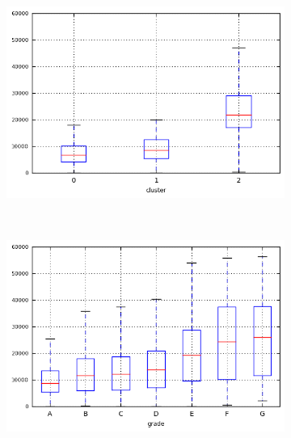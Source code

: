 \begin{anexosenv}
\begin{figure}[ht!]
\begin{subfigure}[t]{0.45\textwidth}
        \end{subfigure}
\end{figure}



\begin{figure}[ht!]
    \centering
        \caption{\emph{Boxplots} de total\textunderscore pymnt\textunderscore inv }
        \begin{subfigure}[t]{0.45\textwidth}
            \centering

            \centerline{\includegraphics[width=1\textwidth]{img/total_pymnt_inv_by_cluster}}
        \end{subfigure}%
        ~ 
        \begin{subfigure}[t]{0.45\textwidth}
            \centering
   
            \centerline{\includegraphics[width=1\textwidth]{img/total_pymnt_inv_by_grade}}


\end{subfigure}
\end{figure}
\end{anexosenv}
